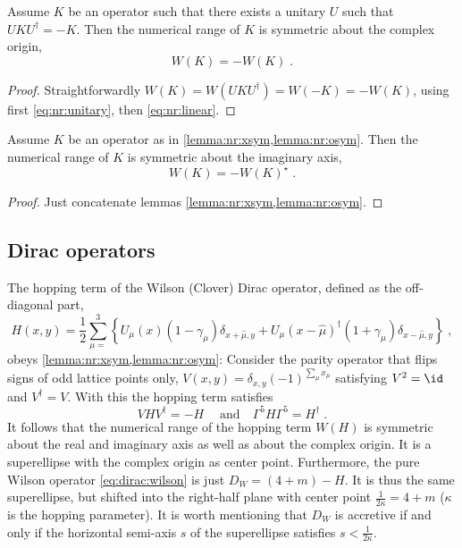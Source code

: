 \begin{lemma} \label{lemma:nr:osym}
Assume $K$ be an operator such that there exists a unitary $U$ such that $U K U^{\dagger} = -K$.
Then the numerical range of $K$ is symmetric about the complex origin,
\begin{equation}
W(K) = - W(K) \;.
\end{equation}
\end{lemma}

\begin{proof}
Straightforwardly $W(K) = W(U K U^{\dagger}) = W(-K) = -W(K)$, using first \cref{eq:nr:unitary}, then \cref{eq:nr:linear}.
\end{proof}

\begin{corollary} \label{lemma:nr:ysym}
Assume $K$ be an operator as in \cref{lemma:nr:xsym,lemma:nr:osym}.
Then the numerical range of $K$ is symmetric about the imaginary axis,
\begin{equation}
W(K) = - W(K)^{\star} \;.
\end{equation}
\end{corollary}

\begin{proof}
Just concatenate lemmas \cref{lemma:nr:xsym,lemma:nr:osym}.
\end{proof}

\subsection{Dirac operators}

The hopping term of the Wilson (Clover) Dirac operator, defined as the off-diagonal part,
\begin{equation}
H(x,y) = \frac{1}{2} \sum_{\mu=}^{3}
\left\{
      U_{\mu}(x) (1 - \gamma_{\mu}) \delta_{x+\hat{\mu}, y}
    + U_{\mu}(x - \hat{\mu})^{\dagger} (1 + \gamma_{\mu}) \delta_{x-\hat{\mu}, y}
\right\} \;,
\end{equation}
obeys \cref{lemma:nr:xsym,lemma:nr:osym}:
Consider the parity operator that flips signs of odd lattice points only, $V(x,y) = \delta_{x,y} (-1)^{\sum_{\mu} x_{\mu}}$ satisfying $V^{2} = \id$ and $V^{\dagger} = V$.
With this the hopping term satisfies
\begin{equation}
V H V^{\dagger} = -H \;
\quad
\text{and}
\quad
\Gamma^{5} H \Gamma^{5} = H^{\dagger} \;.
\end{equation}
It follows that the numerical range of the hopping term $W(H)$ is symmetric about the real and imaginary axis as well as about the complex origin.
It is a superellipse with the complex origin as center point.
Furthermore, the pure Wilson operator \cref{eq:dirac:wilson} is just $D_W = (4+m) - H$.
It is thus the same superellipse, but shifted into the right-half plane with center point $\frac{1}{2 \kappa} = 4+m$ ($\kappa$ is the hopping parameter).
It is worth mentioning that $D_W$ is accretive if and only if the horizontal semi-axis $s$ of the superellipse satisfies $s < \frac{1}{2 \kappa}$.

